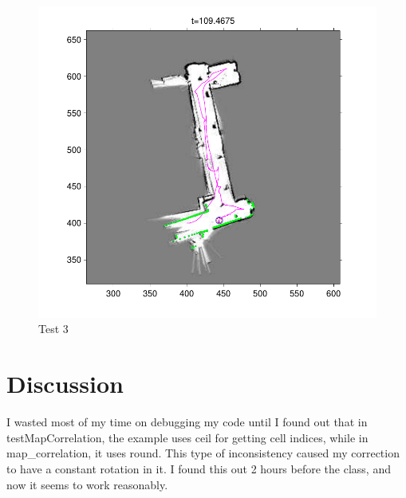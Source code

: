 \documentclass[twoside]{article}
\begin{document}
\begin{multicols}{2}
\begin{figure}[H]
\centering
\includegraphics[width=\columnwidth]{fig/test3.pdf}
\caption{Test 3}
\label{fig:test3}
\end{figure}

\section{Discussion}
I wasted most of my time on debugging my code until I found out that in testMapCorrelation,
the example uses ceil for getting cell indices, while in map\_correlation, it uses round.
This type of inconsistency caused my correction to have a constant rotation in it. I found this
out 2 hours before the class, and now it seems to work reasonably.

%
%
%
%


\end{multicols}
\end{document}
